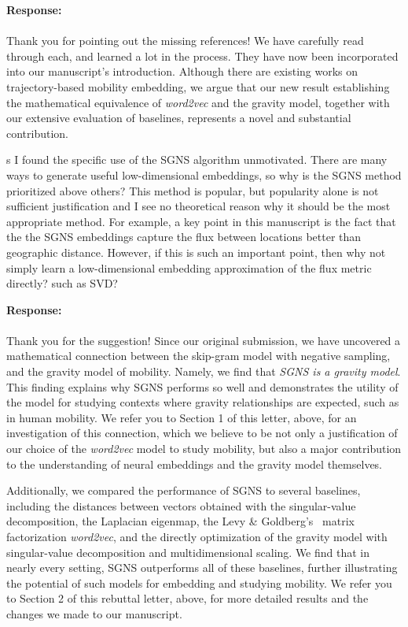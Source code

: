 \documentclass[12pt,draft,a4paper]{article}
\newcounter{comment}[subsection]
\newcommand{\response}[1]{{\noindent \textbf{Response:} \\ \\ \noindent #1}}
\newcommand{\rcomment}[1]{%
\vspace{10pt}
\begin{sectionbox}
s #1
\end{sectionbox}
}
\begin{document}
\response{Thank you for pointing out the missing references!
	We have carefully read through each, and learned a lot in the process.
	They have now been incorporated into our manuscript's introduction.
	Although there are existing works on trajectory-based mobility embedding, we argue that our new result establishing the mathematical equivalence of \textit{word2vec} and the gravity model, together with our extensive evaluation of baselines, represents a novel and substantial contribution.
}

\rcomment{
	I found the specific use of the SGNS algorithm unmotivated. There are many ways to generate useful low-dimensional embeddings, so why is the SGNS method prioritized above others? This method is popular, but popularity alone is not sufficient justification and I see no theoretical reason why it should be the most appropriate method. For example, a key point in this manuscript is the fact that the the SGNS embeddings capture the flux between locations better than geographic distance. However, if this is such an important point, then why not simply learn a low-dimensional embedding approximation of the flux metric directly? such as SVD?
}

\response{
	Thank you for the suggestion!
	Since our original submission, we have uncovered a mathematical connection between the skip-gram model with negative sampling, and the gravity model of mobility.
	Namely, we find that \emph{SGNS is a gravity model}.
	This finding explains why SGNS performs so well and demonstrates the utility of the model for studying contexts where gravity relationships are expected, such as in human mobility.
	We refer you to Section 1 of this letter, above, for an investigation of this connection, which we believe to be not only a justification of our choice of the \textit{word2vec} model to study mobility, but also a major contribution to the understanding of neural embeddings and the gravity model themselves.

	Additionally, we compared the performance of SGNS to several baselines, including the distances between vectors obtained with the singular-value decomposition, the Laplacian eigenmap, the Levy
	\& Goldberg's~\autocite{levy2014neural} matrix factorization \textit{word2vec}, and the directly optimization of the gravity model with singular-value decomposition and multidimensional scaling.
	We find that in nearly every setting, SGNS outperforms all of these baselines, further illustrating the potential of such models for embedding and studying mobility.
	We refer you to Section 2 of this rebuttal letter, above, for more detailed results and the changes we made to our manuscript.
}
\end{document}
